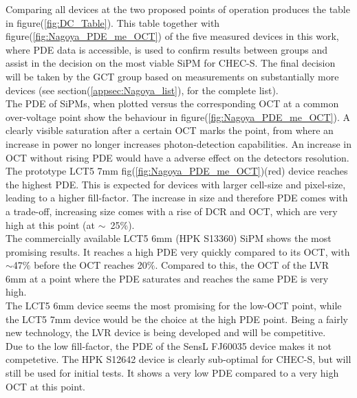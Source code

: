 \documentclass[12pt,article,type=msc,colorback,accentcolor=tud9c]{tudthesis}
\begin{document}
Comparing all devices at the two proposed points of operation produces the table in figure(\ref{fig:DC_Table}). This table together with figure(\ref{fig:Nagoya_PDE_me_OCT}) of the five measured devices in this work, where PDE data is accessible, is used to confirm results between groups and assist in the decision on the most viable SiPM for CHEC-S. The final decision will be taken by the GCT group based on measurements on substantially more devices (see section(\ref{appsec:Nagoya_list}), for the complete list).\\
The PDE of SiPMs, when plotted versus the corresponding OCT at a common over-voltage point show the behaviour in figure(\ref{fig:Nagoya_PDE_me_OCT}). A clearly visible saturation  after a certain OCT marks the point, from where an increase in power no longer increases photon-detection capabilities. An increase in OCT without rising PDE would have a adverse effect on the detectors resolution.\\
The prototype LCT5 7mm fig(\ref{fig:Nagoya_PDE_me_OCT})(red) device reaches the highest PDE. This is expected for devices with larger cell-size and pixel-size, leading to a higher fill-factor. The increase in size and therefore PDE comes with a trade-off, increasing size comes with a rise of DCR and OCT, which are very high at this point (at $\sim$~25$\%$).\\
The commercially available LCT5 6mm (HPK S13360) SiPM shows the most promising results. It reaches a high PDE very quickly compared to its OCT, with $\sim$47$\%$ before the OCT reaches 20$\%$. Compared to this, the OCT of the LVR 6mm at a point where the PDE saturates and reaches the same PDE is very high.\\
The LCT5 6mm device seems the most promising for the low-OCT point, while the LCT5 7mm device would be the choice at the high PDE point. Being a fairly new technology, the LVR device is being developed and will be competitive.\\
Due to the low fill-factor, the PDE of the SensL FJ60035 device makes it not competetive.
The HPK S12642 device is clearly sub-optimal for CHEC-S, but will still be used for initial tests. It shows a very low PDE compared to a very high OCT at this point.











\end{document}
